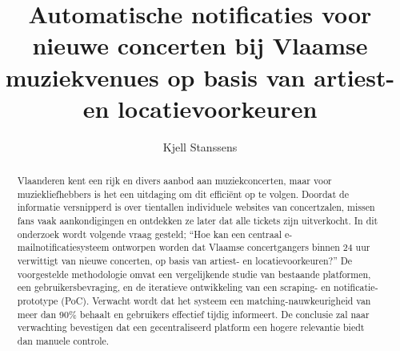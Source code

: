 \documentclass{hogent-article}
\title{Automatische notificaties voor nieuwe concerten bij Vlaamse muziekvenues op basis van artiest- en locatievoorkeuren}
\author{Kjell Stanssens}
\begin{document}
\begin{abstract}
  Vlaanderen kent een rijk en divers aanbod aan muziekconcerten, maar voor muziekliefhebbers is het een uitdaging om dit efficiënt op te volgen. Doordat de informatie versnipperd is over tientallen individuele websites van concertzalen, missen fans vaak aankondigingen en ontdekken ze later dat alle tickets zijn uitverkocht. In dit onderzoek wordt volgende vraag gesteld; ``Hoe kan een centraal e-mailnotificatiesysteem ontworpen worden dat Vlaamse concertgangers binnen 24 uur verwittigt van nieuwe concerten, op basis van artiest- en locatievoorkeuren?'' De voorgestelde methodologie omvat een vergelijkende studie van bestaande platformen, een gebruikersbevraging, en de iteratieve ontwikkeling van een scraping- en notificatie-prototype (PoC). Verwacht wordt dat het systeem een matching-nauwkeurigheid van meer dan 90\% behaalt en gebruikers effectief tijdig informeert. De conclusie zal naar verwachting bevestigen dat een gecentraliseerd platform een hogere relevantie biedt dan manuele controle.
\end{abstract}

\tableofcontents



\printbibliography[heading=bibintoc]
\end{document}
